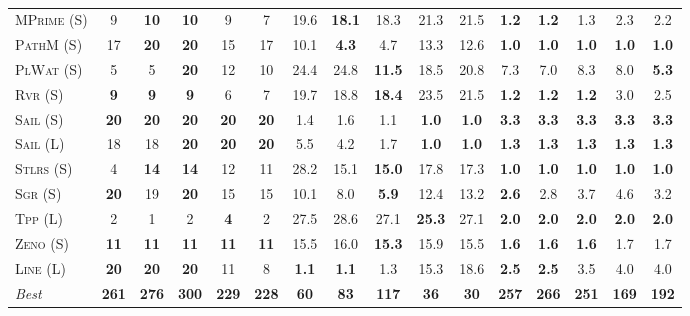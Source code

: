 \documentclass[11pt,landscape]{article}
\begin{document}
\begin{table*}[tb]
{\begin{tabular}{|l||ccccc||ccccc||ccccc||}
\textsc{MPrime} (S)&9&\textbf{10}&\textbf{10}&9&7&19.6&\textbf{18.1}&18.3&21.3&21.5&\textbf{1.2}&\textbf{1.2}&1.3&2.3&2.2\\
\textsc{PathM} (S)&17&\textbf{20}&\textbf{20}&15&17&10.1&\textbf{4.3}&4.7&13.3&12.6&\textbf{1.0}&\textbf{1.0}&\textbf{1.0}&\textbf{1.0}&\textbf{1.0}\\
\textsc{PlWat} (S)&5&5&\textbf{20}&12&10&24.4&24.8&\textbf{11.5}&18.5&20.8&7.3&7.0&8.3&8.0&\textbf{5.3}\\
\textsc{Rvr} (S)&\textbf{9}&\textbf{9}&\textbf{9}&6&7&19.7&18.8&\textbf{18.4}&23.5&21.5&\textbf{1.2}&\textbf{1.2}&\textbf{1.2}&3.0&2.5\\
\textsc{Sail} (S)&\textbf{20}&\textbf{20}&\textbf{20}&\textbf{20}&\textbf{20}&1.4&1.6&1.1&\textbf{1.0}&\textbf{1.0}&\textbf{3.3}&\textbf{3.3}&\textbf{3.3}&\textbf{3.3}&\textbf{3.3}\\
\textsc{Sail} (L)&18&18&\textbf{20}&\textbf{20}&\textbf{20}&5.5&4.2&1.7&\textbf{1.0}&\textbf{1.0}&\textbf{1.3}&\textbf{1.3}&\textbf{1.3}&\textbf{1.3}&\textbf{1.3}\\
\textsc{Stlrs} (S)&4&\textbf{14}&\textbf{14}&12&11&28.2&15.1&\textbf{15.0}&17.8&17.3&\textbf{1.0}&\textbf{1.0}&\textbf{1.0}&\textbf{1.0}&\textbf{1.0}\\
\textsc{Sgr} (S)&\textbf{20}&19&\textbf{20}&15&15&10.1&8.0&\textbf{5.9}&12.4&13.2&\textbf{2.6}&2.8&3.7&4.6&3.2\\
\textsc{Tpp} (L)&2&1&2&\textbf{4}&2&27.5&28.6&27.1&\textbf{25.3}&27.1&\textbf{2.0}&\textbf{2.0}&\textbf{2.0}&\textbf{2.0}&\textbf{2.0}\\
\textsc{Zeno} (S)&\textbf{11}&\textbf{11}&\textbf{11}&\textbf{11}&\textbf{11}&15.5&16.0&\textbf{15.3}&15.9&15.5&\textbf{1.6}&\textbf{1.6}&\textbf{1.6}&1.7&1.7\\
\textsc{Line} (L)&\textbf{20}&\textbf{20}&\textbf{20}&11&8&\textbf{1.1}&\textbf{1.1}&1.3&15.3&18.6&\textbf{2.5}&\textbf{2.5}&3.5&4.0&4.0
\\\hline
\textit{Best}&\textbf{261}&\textbf{276}&\textbf{300}&\textbf{229}&\textbf{228}&\textbf{60}&\textbf{83}&\textbf{117}&\textbf{36}&\textbf{30}&\textbf{257}&\textbf{266}&\textbf{251}&\textbf{169}&\textbf{192}\\\hline

        \end{tabular}}
        \caption{}
        \label{tab:all-patty}
        \end{table*}
        
\end{document}
